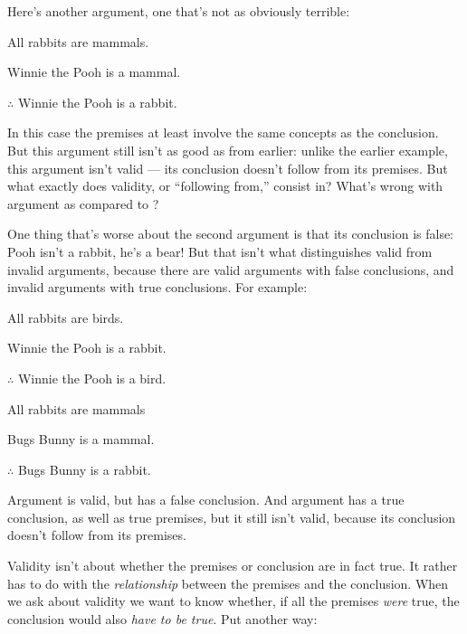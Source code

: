 Here's another argument, one that's not as obviously terrible:
\begin{earg}
\item[\ex{exarg2}]All rabbits are mammals.
\item[] Winnie the Pooh is a mammal.
\item[] $\therefore$ Winnie the Pooh is a rabbit.
\end{earg}
In this case the premises at least involve the same concepts as the conclusion.  But this argument still isn't as good as  from earlier: unlike the earlier example, this argument isn't valid --- its conclusion doesn't follow from its premises.  But what exactly does validity, or ``following from,'' consist in?  What's wrong with argument  as compared to ?

One thing that's worse about the second argument is that its conclusion is false: Pooh isn't a rabbit, he's a bear!  But that isn't what distinguishes valid from invalid arguments, because there are valid arguments with false conclusions, and invalid arguments with true conclusions.  For example:
\begin{earg}
\item[\ex{exarg3}]All rabbits are birds.
\item[] Winnie the Pooh is a rabbit.
\item[] $\therefore$ Winnie the Pooh is a bird.
\end{earg}

\begin{earg}
\item[\ex{exarg4}]All rabbits are mammals
\item[] Bugs Bunny is a mammal.
\item[] $\therefore$ Bugs Bunny is a rabbit.
\end{earg}
Argument  is valid, but has a false conclusion.  And argument  has a true conclusion, as well as true premises, but it still isn't valid, because its conclusion doesn't follow from its premises.  

Validity isn't about whether the premises or conclusion are in fact true.  It rather has to do with the \emph{relationship} between the premises and the conclusion.  When we ask about validity we want to know whether, if all the premises \emph{were} true, the conclusion would also \emph{have to be true}.  Put another way:



